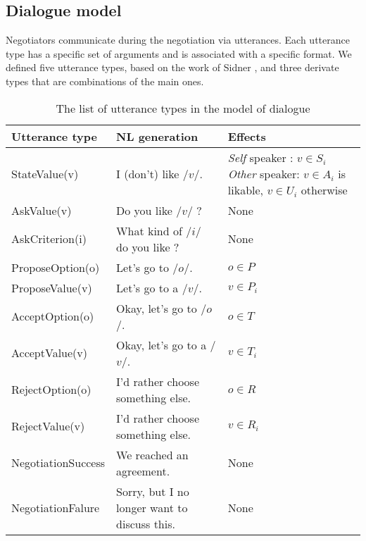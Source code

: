 \documentclass{llncs}
\begin{document}
	\subsection{Dialogue model}
	Negotiators communicate during the negotiation via utterances. Each utterance type has a specific set of arguments and is associated with a specific format. We defined five utterance types, based on the work of Sidner \cite{sidnerartificial}, and three derivate types that are combinations of the main ones.
		\begin{table}[t]
			{\scriptsize
			\begin{tabular} {|p{2.75cm}|p{4cm}|p{3cm}|}
				\hline
				Utterance type  & NL generation & Effects\\
				\hline
				StateValue(v) &  I (don't) like /$v$/. & \textit{Self} speaker : $v \in S_i$ \newline \textit{Other} speaker:  \newline $v\in A_i$ is likable, $v\in U_i$ otherwise \\
				\hline
				 AskValue(v)& Do you like /$v$/ ? & None \\
				 \hline
				 AskCriterion(i) &  What kind of /$i$/ do you like ? & None\\
				 \hline
				 ProposeOption(o)  & Let's go to /$o$/. & $o \in P$\\
				 \hline
				 ProposeValue(v) & Let's go to a /$v$/. & $v \in P_i$\\
				 \hline
				 AcceptOption(o)& Okay, let's go to /$o$/.& $o \in T$ \\
				 \hline
				 AcceptValue(v) & Okay, let's go to a /$v$/.& $v \in T_i$ \\
				\hline
				 RejectOption(o) & I'd rather choose  something else. & $o \in R$\\
				 \hline
				 RejectValue(v) &  I'd rather choose  something else. & $v \in R_i$ \\
				 \hline
				 NegotiationSuccess &  We reached an agreement. & None\\
				 \hline
				 NegotiationFalure &  Sorry, but I no longer want to discuss this. & None\\
				 \hline
			\end{tabular}
			}
			\caption{The list of utterance types in the model of dialogue}
		\end{table}
\end{document}
